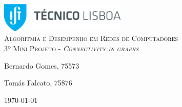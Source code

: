 \begin{titlepage}

	\begin{center}

		\includegraphics[width=6cm]{./title}\\[3cm]

		\textsc{\LARGE Algoritmia e Desempenho em Redes de Computadores}\\[1.5cm]

		\textsc{\Large 3º Mini Projeto - \textit{Connectivity in graphs}}\\[1.5cm]


		


		\noindent
		\begin{minipage}{0.4\textwidth}
			\begin{flushleft} \large
				Bernardo Gomes, 75573
			\end{flushleft}
		\end{minipage}
		\begin{minipage}{0.4\textwidth}
			\begin{flushright} \large
				Tomás Falcato, 75876
			\end{flushright}
		\end{minipage}

		\vfill

		{\large \today}


	\end{center}

\end{titlepage}